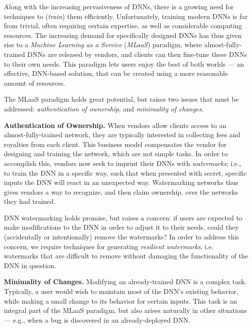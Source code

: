 \documentclass{easychair}
\begin{document}
Along with the increasing pervasiveness of DNNs, there is a growing
need for techniques to (\emph{train}) them efficiently. Unfortunately,
training modern DNNs is far from trivial, often requiring certain
expertise, as well as considerable computing resources. The increasing
demand for specifically designed DNNs has thus given rise to a
\emph{Machine Learning as a Service} (\emph{MLaaS}) paradigm, where
almost-fully-trained DNNs are released by vendors, and clients can
then fine-tune these DNNs to their own needs. This paradigm lets users
enjoy the best of both worlds --- an effective, DNN-based solution,
that can be created using a more reasonable amount of resources.

The MLaaS paradigm holds great potential, but raises two issues that
must be addressed: \emph{authentication of ownership}, and
\emph{minimality of changes}.

\medskip\noindent
\textbf{Authentication of Ownership.}
When vendors allow clients access to an almost-fully-trained network,
they are typically interested in collecting fees and royalties from
each client. This business model compensates the vendor for designing
and training the network, which are not simple tasks. In order to
accomplish this, vendors now seek to imprint their DNNs with
\emph{watermarks}; i.e., to train the DNN in a specific way, such that
when presented with secret, specific inputs the DNN will react in an
unexpected way. Watermarking networks thus gives vendors a way to
recognize, and then claim ownership, over the networks they had
trained.

DNN watermarking holds promise, but raises a concern: if users are
expected to make modifications to the DNN in order to adjust it to
their needs, could they (accidentally or intentionally) remove the
watermarks? In order to address this concern, we require techniques
for generating \emph{resilient watermarks}, i.e. watermarks that are
difficult to remove without damaging the functionality of the DNN in
question.

\medskip\noindent \textbf{Minimality of Changes.}
Modifying an already-trained DNN is a complex task. Typically, a user
would wish to maintain most of the DNN's existing behavior, while
making a small change to its behavior for certain inputs. This task is
an integral part of the MLaaS paradigm, but also arises naturally in
other situations --- e.g., when a bug is discovered in an
already-deployed DNN.
\end{document}
